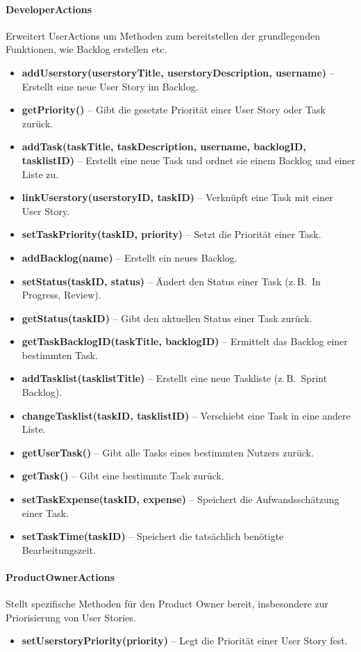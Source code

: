 \documentclass{article}
\begin{document}
\paragraph{DeveloperActions}
Erweitert UserActions um Methoden zum bereitstellen der grundlegenden Funktionen, wie Backlog erstellen etc.
\begin{itemize}
	\item \textbf{addUserstory(userstoryTitle, userstoryDescription, username)} -- Erstellt eine neue User Story im Backlog.
	\item \textbf{getPriority()} -- Gibt die gesetzte Priorität einer User Story oder Task zurück.
	\item \textbf{addTask(taskTitle, taskDescription, username, backlogID, tasklistID)} -- Erstellt eine neue Task und ordnet sie einem Backlog und einer Liste zu.
	\item \textbf{linkUserstory(userstoryID, taskID)} -- Verknüpft eine Task mit einer User Story.
	\item \textbf{setTaskPriority(taskID, priority)} -- Setzt die Priorität einer Task.
	\item \textbf{addBacklog(name)} -- Erstellt ein neues Backlog.
	\item \textbf{setStatus(taskID, status)} -- Ändert den Status einer Task (z.\,B.\ In Progress, Review).
	\item \textbf{getStatus(taskID)} -- Gibt den aktuellen Status einer Task zurück.
	\item \textbf{getTaskBacklogID(taskTitle, backlogID)} -- Ermittelt das Backlog einer bestimmten Task.
	\item \textbf{addTasklist(tasklistTitle)} -- Erstellt eine neue Taskliste (z.\,B.\ Sprint Backlog).
	\item \textbf{changeTasklist(taskID, tasklistID)} -- Verschiebt eine Task in eine andere Liste.
	\item \textbf{getUserTask()} -- Gibt alle Tasks eines bestimmten Nutzers zurück.
	\item \textbf{getTask()} -- Gibt eine bestimmte Task zurück.
	\item \textbf{setTaskExpense(taskID, expense)} -- Speichert die Aufwandsschätzung einer Task.
	\item \textbf{setTaskTime(taskID)} -- Speichert die tatsächlich benötigte Bearbeitungszeit.
\end{itemize}

\paragraph{ProductOwnerActions}
Stellt spezifische Methoden für den Product Owner bereit, insbesondere zur Priorisierung von User Stories.
\begin{itemize}
	\item \textbf{setUserstoryPriority(priority)} -- Legt die Priorität einer User Story fest.
\end{itemize}
\end{document}
